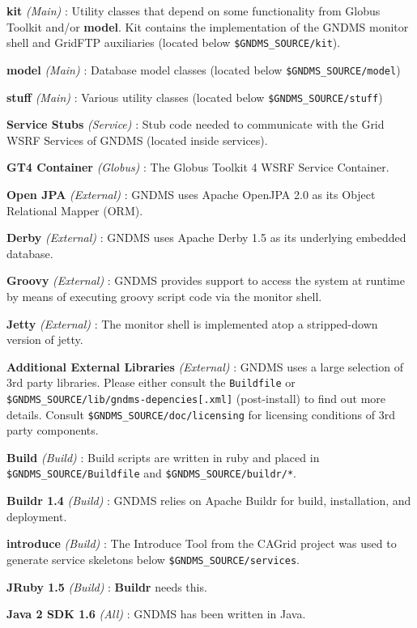 \documentclass{article}
\begin{document}
\textbf{kit} \emph{(Main)} : Utility classes that depend on some
functionality from Globus Toolkit and/or \textbf{model}. Kit
contains the implementation of the GNDMS monitor shell and GridFTP
auxiliaries (located below \verb!$GNDMS_SOURCE/kit!).

\textbf{model} \emph{(Main)} : Database model classes (located
below \verb!$GNDMS_SOURCE/model!)

\textbf{stuff} \emph{(Main)} : Various utility classes (located
below \verb!$GNDMS_SOURCE/stuff!)

\textbf{Service Stubs} \emph{(Service)} : Stub code needed to
communicate with the Grid WSRF Services of GNDMS (located inside
services).

\textbf{GT4 Container} \emph{(Globus)} : The Globus Toolkit 4 WSRF
Service Container.

\textbf{Open JPA} \emph{(External)} : GNDMS uses Apache OpenJPA 2.0
as its Object Relational Mapper (ORM).

\textbf{Derby} \emph{(External)} : GNDMS uses Apache Derby 1.5 as
its underlying embedded database.

\textbf{Groovy} \emph{(External)} : GNDMS provides support to
access the system at runtime by means of executing groovy script
code via the monitor shell.

\textbf{Jetty} \emph{(External)} : The monitor shell is implemented
atop a stripped-down version of jetty.

\textbf{Additional External Libraries} \emph{(External)} : GNDMS
uses a large selection of 3rd party libraries. Please either
consult the \verb!Buildfile! or
\verb!$GNDMS_SOURCE/lib/gndms-depencies[.xml]! (post-install) to
find out more details. Consult \verb!$GNDMS_SOURCE/doc/licensing!
for licensing conditions of 3rd party components.

\textbf{Build} \emph{(Build)} : Build scripts are written in ruby
and placed in \verb!$GNDMS_SOURCE/Buildfile! and
\verb!$GNDMS_SOURCE/buildr/*!.

\textbf{Buildr 1.4} \emph{(Build)} : GNDMS relies on Apache Buildr
for build, installation, and deployment.

\textbf{introduce} \emph{(Build)} : The Introduce Tool from the
CAGrid project was used to generate service skeletons below
\verb!$GNDMS_SOURCE/services!.

\textbf{JRuby 1.5} \emph{(Build)} : \textbf{Buildr} needs this.

\textbf{Java 2 SDK 1.6} \emph{(All)} : GNDMS has been written in
Java.
\end{document}
